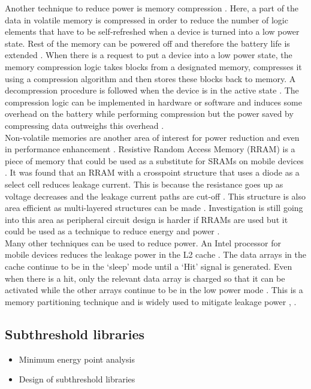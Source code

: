 \documentclass[journal]{IEEEtran}
\begin{document}
Another technique to reduce power is memory compression \cite{MemComp}. Here, a part of the data in volatile memory is compressed in order to reduce the number of logic elements that have to be self-refreshed when a device is turned into a low power state. Rest of the memory can be powered off and therefore the battery life is extended \cite{MemComp}. When there is a request to put a device into a low power state, the memory compression logic takes blocks from a designated memory, compresses it using a compression algorithm and then stores these blocks back to memory. A decompression procedure is followed when the device is in the active state \cite{MemComp}. The compression logic can be implemented in hardware or software and induces some overhead on the battery while performing compression but the power saved by compressing data outweighs this overhead \cite{MemComp}.\\

Non-volatile memories are another area of interest for power reduction and even in performance enhancement \cite{NonVolatile}. Resistive Random Access Memory (RRAM) is a piece of memory that could be used as a substitute for SRAMs on mobile devices \cite{NonVolatile}. It was found that an RRAM with a crosspoint structure that uses a diode as a select cell reduces leakage current. This is because the resistance goes up as voltage decreases and the leakage current paths are cut-off \cite{NonVolatile}. This structure is also area efficient as multi-layered structures can be made \cite{NonVolatile}. Investigation is still going into this area as peripheral circuit design is harder if RRAMs are used but it could be used as a technique to reduce energy and power \cite{NonVolatile}.\\

Many other techniques can be used to reduce power. An Intel processor for mobile devices reduces the leakage power in the L2 cache \cite{Intel}. The data arrays in the cache continue to be in the ‘sleep’ mode until a ‘Hit’ signal is generated. Even when there is a hit, only the relevant data array is charged so that it can be activated while the other arrays continue to be in the low power mode \cite{Intel}. This is a memory partitioning technique and is widely used to mitigate leakage power \cite{LowPower2005}, \cite{Intel}.

\subsection{Subthreshold libraries}
\begin{itemize}
	\item Minimum energy point analysis \cite{FFT}
	\item Design of subthreshold libraries \cite{FFT}
\end{itemize}
\end{document}
